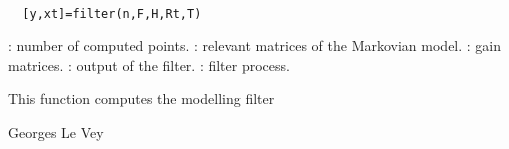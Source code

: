 
\begin{mandesc}
   \\ %
\end{mandesc}
\begin{calling_sequence}
\begin{verbatim}
  [y,xt]=filter(n,F,H,Rt,T)  
\end{verbatim}
\end{calling_sequence}
\begin{parameters}
  \begin{varlist}
    : number of computed points.
    : relevant matrices of the Markovian model.
    : gain matrices.
    : output of the filter.
    : filter process.
  \end{varlist}
\end{parameters}
\begin{mandescription}
  This function computes the modelling filter
\end{mandescription}
\begin{manseealso}
\end{manseealso}
\begin{authors}
  Georges Le Vey
\end{authors}
